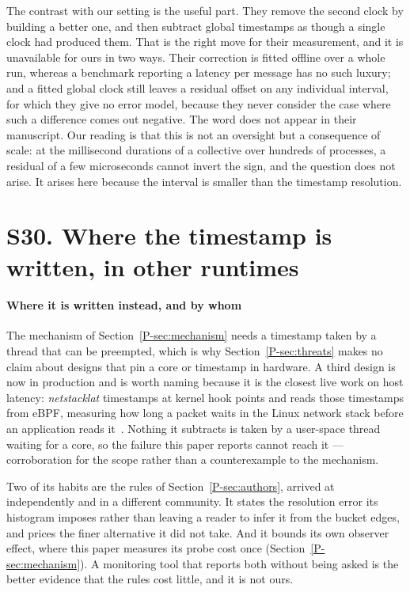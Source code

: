 \documentclass[10pt,journal,onecolumn]{IEEEtran}
\newcommand{\mainThreats}{\ref{P-sec:threats}}        %
\newcommand{\mainModeA}{\ref{P-sec:mechanism}}             %
\newcommand{\mainAuthors}{\ref{P-sec:authors}}        %
\begin{document}
The contrast with our setting is the useful part. They remove the second clock by building a
better one, and then subtract global timestamps as though a single clock had produced them.
That is the right move for their measurement, and it is unavailable for ours in two ways.
Their correction is fitted offline over a whole run, whereas a benchmark reporting a latency
per message has no such luxury; and a fitted global clock still leaves a residual offset on
any individual interval, for which they give no error model, because they never consider the
case where such a difference comes out negative. The word does not appear in their
manuscript. Our reading is that this is not an oversight but a consequence of scale: at the
millisecond durations of a collective over hundreds of processes, a residual of a few
microseconds cannot invert the sign, and the question does not arise. It arises here because
the interval is smaller than the timestamp resolution.

\section{S30. Where the timestamp is written, in other runtimes}
\label{sec:runtimes}

\paragraph{Where it is written instead, and by whom}
The mechanism of Section~\mainModeA{} needs a timestamp taken by a thread that can be
preempted, which is why Section~\mainThreats{} makes no claim about designs that pin a
core or timestamp in hardware. A third design is now in production and is worth naming
because it is the closest live work on host latency: \emph{netstacklat} timestamps at kernel
hook points and reads those timestamps from eBPF, measuring how long a packet waits in the
Linux network stack before an application reads
it~\cite{sundberg2026netstacklat}. Nothing it subtracts is taken by a user-space thread
waiting for a core, so the failure this paper reports cannot reach it --- corroboration
for the scope rather than a counterexample to the mechanism.

Two of its habits are the rules of Section~\mainAuthors{}, arrived at independently and
in a different community. It states the resolution error its histogram imposes rather
than leaving a reader to infer it from the bucket edges, and prices the finer alternative
it did not take. And it bounds its own observer effect, where this paper measures its
probe cost once (Section~\mainModeA{}). A monitoring tool that reports both without
being asked is the better evidence that the rules cost little, and it is not ours.
\end{document}
